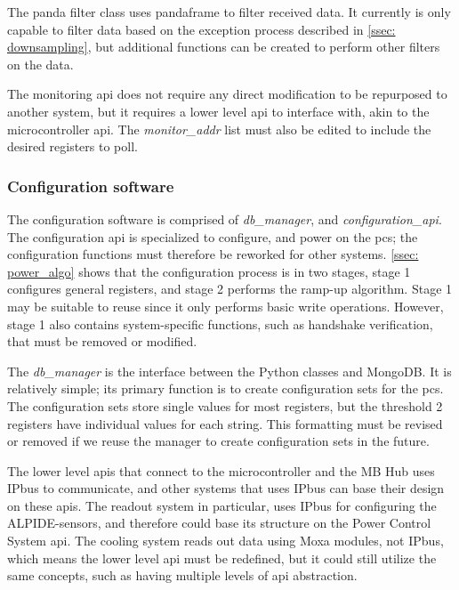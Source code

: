 \documentclass[main.tex]{subfiles}
\begin{document}
The panda filter class uses pandaframe to filter received data. It currently is only capable to filter data based on the exception process described in \autoref{ssec: downsampling}, but additional functions can be created to perform other filters on the data.

The monitoring \gls{api} does not require any direct modification to be repurposed to another system, but it requires a lower level \gls{api} to interface with, akin to the microcontroller \gls{api}. The \textit{monitor\_addr} list must also be edited to include the desired registers to poll.

\subsubsection{Configuration software}

The configuration software is comprised of \textit{db\_manager}, and \textit{configuration\_api}. The configuration \gls{api} is specialized to configure, and power on the \gls{pcs}; the configuration functions must therefore be reworked for other systems. \autoref{ssec: power_algo} shows that the configuration process is in two stages, stage 1 configures general registers, and stage 2 performs the ramp-up algorithm. Stage 1 may be suitable to reuse since it only performs basic write operations. However, stage 1 also contains system-specific functions, such as handshake verification, that must be removed or modified.

The \textit{db\_manager} is the interface between the Python classes and MongoDB. It is relatively simple; its primary function is to create configuration sets for the \gls{pcs}. The configuration sets store single values for most registers, but the threshold 2 registers have individual values for each string. This formatting must be revised or removed if we reuse the manager to create configuration sets in the future. 

The lower level \gls{api}s that connect to the microcontroller and the MB Hub uses IPbus to communicate, and other systems that uses IPbus can base their design on these \gls{api}s. The readout system in particular, uses IPbus for configuring the ALPIDE-sensors, and therefore could base its structure on the Power Control System \gls{api}. The cooling system reads out data using Moxa modules, not IPbus, which means the lower level \gls{api} must be redefined, but it could still utilize the same concepts, such as having multiple levels of \gls{api} abstraction.
 
\end{document}
